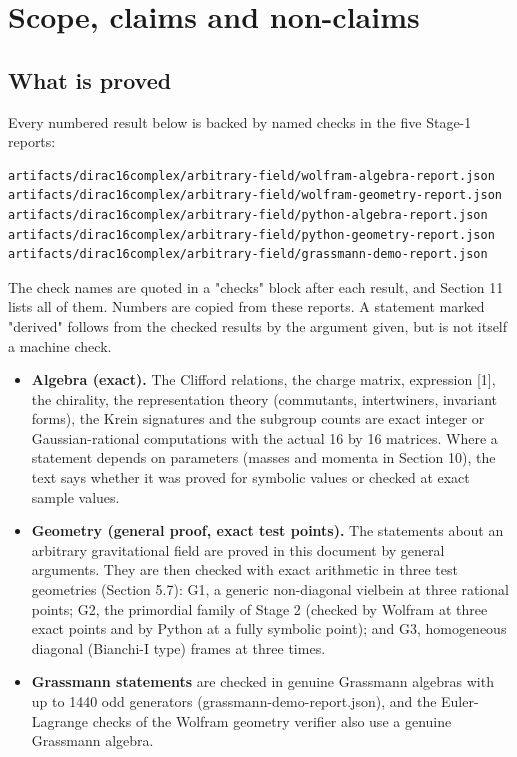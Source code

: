 \documentclass[11pt]{article}
\begin{document}
\section{Scope, claims and non-claims}

\subsection{What is proved}

Every numbered result below is backed by named checks in the five Stage-1 reports:

\begin{Verbatim}[fontsize=\small]
artifacts/dirac16complex/arbitrary-field/wolfram-algebra-report.json
artifacts/dirac16complex/arbitrary-field/wolfram-geometry-report.json
artifacts/dirac16complex/arbitrary-field/python-algebra-report.json
artifacts/dirac16complex/arbitrary-field/python-geometry-report.json
artifacts/dirac16complex/arbitrary-field/grassmann-demo-report.json
\end{Verbatim}

The check names are quoted in a "checks" block after each result, and Section 11 lists all of them. Numbers are copied from these reports. A statement marked "derived" follows from the checked results by the argument given, but is not itself a machine check.

\begin{itemize}
\item \textbf{Algebra (exact).} The Clifford relations, the charge matrix, expression [1], the chirality, the representation theory (commutants, intertwiners, invariant forms), the Krein signatures and the subgroup counts are exact integer or Gaussian-rational computations with the actual 16 by 16 matrices. Where a statement depends on parameters (masses and momenta in Section 10), the text says whether it was proved for symbolic values or checked at exact sample values.
\item \textbf{Geometry (general proof, exact test points).} The statements about an arbitrary gravitational field are proved in this document by general arguments. They are then checked with exact arithmetic in three test geometries (Section 5.7): G1, a generic non-diagonal vielbein at three rational points; G2, the primordial family of Stage 2 (checked by Wolfram at three exact points and by Python at a fully symbolic point); and G3, homogeneous diagonal (Bianchi-I type) frames at three times.
\item \textbf{Grassmann statements} are checked in genuine Grassmann algebras with up to 1440 odd generators (grassmann-demo-report.json), and the Euler-Lagrange checks of the Wolfram geometry verifier also use a genuine Grassmann algebra.
\end{itemize}
\end{document}
